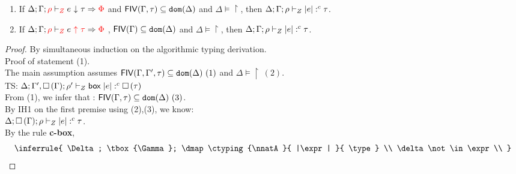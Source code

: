 \begin{thm}
\begin{enumerate}
    \item  If $	\Delta; \Gamma;  \red{\dmap} \tvdash{\red{\nnatA}} \chec{\expr}{\type}{ \restriction }$ and $\fiv{\Gamma, \tau} \subseteq  \dom(\Delta) $ and $\Delta \models \restriction$, then $ \Delta; \Gamma; \dmap \ctyping{\nnatA}{|\expr| }{ \type } $.
    \item  If $ \Delta; \Gamma;  \red {\dmap} \tvdash{\red{\nnatA } } \infr{\expr}{ 
            \type }{\restriction}{.} $ , $\fiv{ \Gamma} \subseteq  \dom(\Delta) $ and $\Delta \models \restriction$,  then $ \Delta; \Gamma; \dmap \ctyping{\nnatA}{|\expr| }{ \type } $.
\end{enumerate}
\end{thm}
\begin{proof}
By simultaneous induction on the algorithmic typing derivation.\\
Proof of statement (1).\\
The main assumption assumes $\fiv{ \Gamma,\Gamma', \tau}  \subseteq  \dom(\Delta) ~(1)$ and $\Delta \models \restriction~(2)$.\\
TS: $ \Delta; \Gamma', \tbox{\Gamma}; \dmap' \ctyping{\nnatA}{\cbox \eapp |\expr| }{ \tbox{\type} } $\\
%
From (1), we infer that : $\fiv{ \Gamma, \tau}  \subseteq  \dom(\Delta)~(3)$.\\
By IH1 on the first premise using (2),(3), we know:\\
$  \Delta;  \tbox{\Gamma}; \dmap \ctyping{\nnatA}{ |\expr| }{ \type }  $.\\
By the rule \textbf{c-box}, 
 \[
      \inferrule
     {
        \Delta; \tbox{\Gamma}; \dmap \ctyping{\nnatA}{ |\expr| }{ \type} 
           \\
        \delta \not\in \expr
        \\
}\]
\end{proof}

